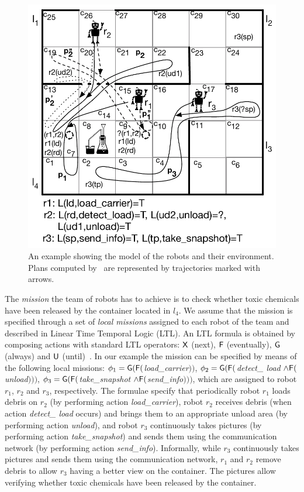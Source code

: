 \begin{figure}[!t]
\begin{center}
\includegraphics[width=0.9\linewidth]{Figures/motivatingExample.pdf}
\caption{An example showing the model of the robots and their environment. Plans computed by \toolName\ are represented by trajectories marked with arrows.}
\label{fig:example1}
\end{center}
\end{figure}

The \emph{mission}  the team of robots has to achieve is to check whether toxic chemicals have been released by the container located in $l_4$.
We assume that the mission is specified through a set of \emph{local missions} assigned to each robot of the team and described in Linear Time Temporal Logic  (LTL).
An LTL formula is obtained by composing actions with standard LTL operators: $\mathsf{X}$ (next), $\mathsf{F}$  (eventually),  $\mathsf{G}$ (always) and $\mathsf{U}$ (until)~\cite{pnueli1977temporal}. 
In our example the mission  can be specified by means of the following local missions: $\phi_1=\mathsf{G} (\mathsf{F} ($\emph{load\_carrier}$))$, 
$\phi_2=\mathsf{G} (\mathsf{F}($\emph{detect\_ load} $ \wedge \mathsf{F} ($\emph{unload}$)))$, 
 $\phi_3=\mathsf{G} ( \mathsf{F} ($\emph{take\_snapshot} $\wedge \mathsf{F} ($\emph{send\_info}$)))$, which are assigned to robot $r_1$, $r_2$ and $r_3$, respectively.
The formulae specify that periodically robot $r_1$ loads debris on $r_2$ (by performing action \emph{load\_carrier}), robot $r_2$ receives debris (when action \emph{detect\_ load} occurs)  and brings them to an appropriate unload area (by performing action \emph{unload}), and robot $r_3$ continuously takes pictures (by performing action \emph{take\_snapshot}) and sends them using the communication network (by performing action \emph{send\_info}).
Informally, while $r_3$ continuously takes pictures and sends them using the communication network, $r_1$ and $r_2$ remove debris to allow $r_3$ having a better view on the container.
The pictures allow verifying whether toxic chemicals have been released by the container.

